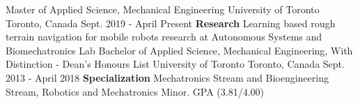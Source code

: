 \begin{cventries}
  \cventry
    {Master of Applied Science, Mechanical Engineering}
    {University of Toronto}
    {Toronto, Canada}
    {Sept. 2019 - April Present}
    {
    \textbf{Research} Learning based rough terrain navigation for mobile robots research at Autonomous Systems and Biomechatronics Lab
    }
  \cventry
    {Bachelor of Applied Science, Mechanical Engineering, With Distinction - Dean's Honours List}
    {University of Toronto}
    {Toronto, Canada}
    {Sept. 2013 - April 2018}
    {
    \textbf{Specialization} Mechatronics Stream and Bioengineering Stream, Robotics and Mechatronics Minor. GPA (3.81/4.00)
    }

\end{cventries}
